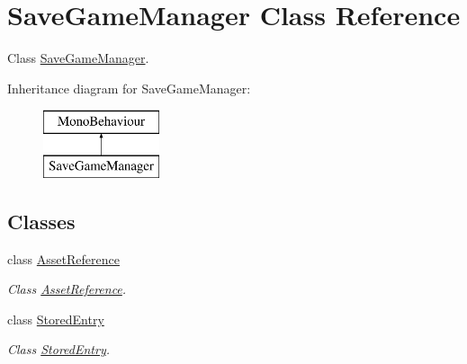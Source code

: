 \hypertarget{class_save_game_manager}{}\section{Save\+Game\+Manager Class Reference}
\label{class_save_game_manager}


Class \hyperlink{class_save_game_manager}{Save\+Game\+Manager}.  


Inheritance diagram for Save\+Game\+Manager\+:\begin{figure}[H]
\begin{center}
\leavevmode
\includegraphics[height=2.000000cm]{class_save_game_manager}
\end{center}
\end{figure}
\subsection*{Classes}
\begin{DoxyCompactItemize}
\item 
class \hyperlink{class_save_game_manager_1_1_asset_reference}{Asset\+Reference}
\begin{DoxyCompactList}\small\item\em Class \hyperlink{class_save_game_manager_1_1_asset_reference}{Asset\+Reference}. \end{DoxyCompactList}\item 
class \hyperlink{class_save_game_manager_1_1_stored_entry}{Stored\+Entry}
\begin{DoxyCompactList}\small\item\em Class \hyperlink{class_save_game_manager_1_1_stored_entry}{Stored\+Entry}. \end{DoxyCompactList}\end{DoxyCompactItemize}
